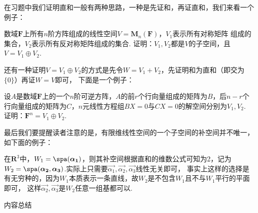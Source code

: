 在习题中我们证明直和一般有两种思路，一种是先证和，再证直和，我们来看一个例子：
\begin{example}
    数域$\mathbf{F}$上所有$n$阶方阵组成的线性空间$V=\mathbf{M}_n(\mathbf{F})$，$V_1$表示所有对称矩阵
    组成的集合，$V_2$表示所有反对称矩阵组成的集合. 证明：$V_1,V_2$都是$V$的子空间，且$V=V_1\oplus V_2$.
\end{example}
还有一种证明$V=V_1\oplus V_2$的方式是先令$W=V_1+V_2$，先证明和为直和（即交为$\{0\}$）再证$W=V$即可，
下面是一个例子：
\begin{example}
    设$A$是数域$\mathbf{F}$上的一个$n$阶可逆方阵，$A$的前$r$个行向量组成的矩阵为$B$，后$n-r$个
    行向量组成的矩阵为$C$，$n$元线性方程组$BX=0$与$CX=0$的解空间分别为$V_1,V_2$. 证明：$\mathbf{F}^n=V_1\oplus V_2$.
\end{example}

最后我们要提醒读者注意的是，有限维线性空间的一个子空间的补空间并不唯一，如下面的例子：
\begin{example}
    在$\mathbf{R}^3$中，$W_1=\spa(\vec{\alpha_1})$，则其补空间根据直和的维数公式可知为2，记为
    $W_2=\spa(\vec{\alpha_2},\vec{\alpha_3})$.实际上只需要$\vec{\alpha_1},\vec{\alpha_2},\vec{\alpha_3}$线性无关即可，
    事实上这样的选择是有无穷种的，因为$W_1$本质表示一条直线，故$W_2$是不包含$W_1$且不与$W_1$平行的平面即可，
    这样$\vec{\alpha_2},\vec{\alpha_3}$是$W_2$任意一组基都可以.
\end{example}

\vspace{2ex}
\centerline{\heiti \Large 内容总结}

\vspace{2ex}

